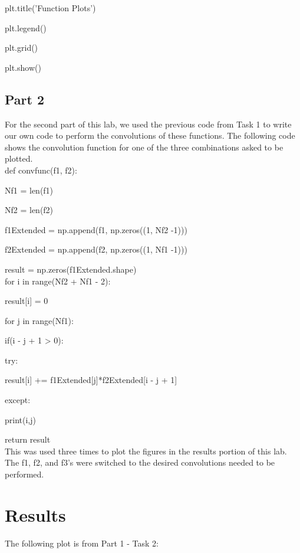 \documentclass[12pt]{report}
\begin{document}
\indent plt.title('Function Plots')

\indent plt.legend()

\indent plt.grid()

\indent plt.show()\\

\subsection{Part 2}
For the second part of this lab, we used the previous code from Task 1 to write our own code to perform the convolutions of these functions. The following code shows the convolution function for one of the three combinations asked to be plotted. \\

\noindent def convfunc(f1, f2):

\indent    Nf1 = len(f1)
    
\indent    Nf2 = len(f2)
    
\indent    f1Extended = np.append(f1, np.zeros((1, Nf2 -1)))
    
\indent    f2Extended = np.append(f2, np.zeros((1, Nf1 -1)))
    
\indent    result = np.zeros(f1Extended.shape)\\

\indent    for i in range(Nf2 + Nf1 - 2):
    
\indent\indent        result[i] = 0
        
\indent\indent        for j in range(Nf1):
        
\indent\indent\indent            if(i - j + 1 > 0):
            
\indent\indent\indent\indent                try:
                
\indent\indent\indent                    result[i] += f1Extended[j]*f2Extended[i - j + 1]
                    
\indent\indent                except:
                
\indent\indent\indent                        print(i,j)
                        
\indent    return result\\
    
\noindent This was used three times to plot the figures in the results portion of this lab. The f1, f2, and f3's were switched to the desired convolutions needed to be performed. 

\newpage

\section{Results}
The following plot is from Part 1 - Task 2:
\end{document}
